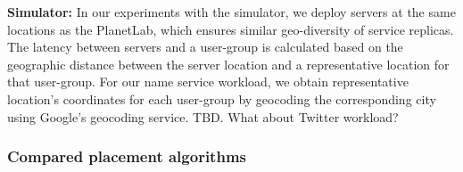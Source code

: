 %
%
%
%

%
%
%



\textbf{Simulator:} In our experiments with the simulator, we deploy servers at the same locations as the PlanetLab, which ensures similar geo-diversity of service replicas. 
The latency between servers and a user-group is calculated based on the geographic distance between the server location and a representative location for that user-group.
For our name service workload, we obtain representative location's coordinates for each user-group  by geocoding the corresponding city using Google's geocoding service.  
TBD. What about Twitter workload?



%
%


\subsubsection{Compared placement algorithms}

